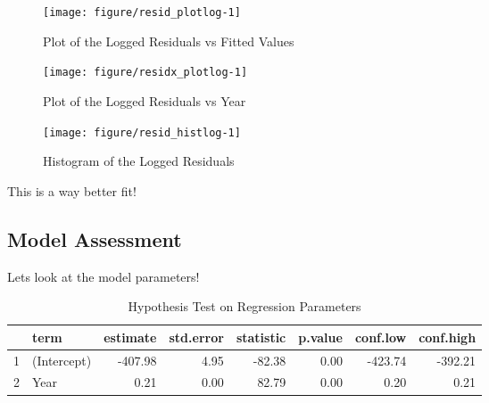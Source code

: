 \documentclass[english]{article}\usepackage[]{graphicx}\usepackage[]{color}
\newenvironment{knitrout}{}{} %
\begin{document}
	\begin{figure}[H]
		\caption{Plot of the Logged Residuals vs Fitted Values}
		\begin{center}
\begin{knitrout}
\color{fgcolor}
\texttt{[image: figure/resid\_plotlog-1]} 

\end{knitrout}
			\par\end{center}
	\end{figure}
	
	\begin{figure}[H]
		\begin{center}
			\caption{Plot of the Logged Residuals vs Year}
\begin{knitrout}
\color{fgcolor}
\texttt{[image: figure/residx\_plotlog-1]} 

\end{knitrout}
			\par\end{center}
	\end{figure}
	\begin{figure}[H]
		\caption{Histogram of the Logged Residuals}
		\begin{center}
\begin{knitrout}
\color{fgcolor}
\texttt{[image: figure/resid\_histlog-1]} 

\end{knitrout}
			\par\end{center}
	\end{figure}
This is a way better fit!
\subsection{Model Assessment}
Lets look at the model parameters!
\begin{table}[H]
\centering
\caption{Hypothesis Test on Regression Parameters} 
\label{tb:betas}
\begin{tabular}{rlrrrrrr}
  \toprule
 & term & estimate & std.error & statistic & p.value & conf.low & conf.high \\ 
  \midrule
1 & (Intercept) & -407.98 & 4.95 & -82.38 & 0.00 & -423.74 & -392.21 \\ 
  2 & Year & 0.21 & 0.00 & 82.79 & 0.00 & 0.20 & 0.21 \\ 
   \bottomrule
\end{tabular}
\end{table}
\end{document}

